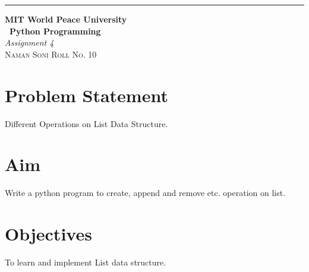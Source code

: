 \documentclass{article}
\begin{document}
	\begin{titlepage} %
		
		\raggedleft\rule{1pt}{\textheight} %
		\hspace{0.05\textwidth} %
		\parbox[b]{0.75\textwidth}
		{ %
			
			{\Huge\bfseries MIT World Peace University \\[0.5\baselineskip] \ Python Programming}\\[2\baselineskip] %
			{\large\textit{Assignment 4}}\\[4\baselineskip] %
			{\Large\textsc{Naman Soni Roll No. 10}} %
			
			\vspace{0.5\textheight} %
		}
		
	\end{titlepage}
	\tableofcontents
	\pagebreak
	\section{\textbf{Problem Statement}}
	Different Operations on List Data Structure.
	\section{\textbf{Aim}}
	Write a python program to create, append and remove etc. operation on list.
	\section{\textbf{Objectives}}
	To learn and implement List data structure.
\end{document}
